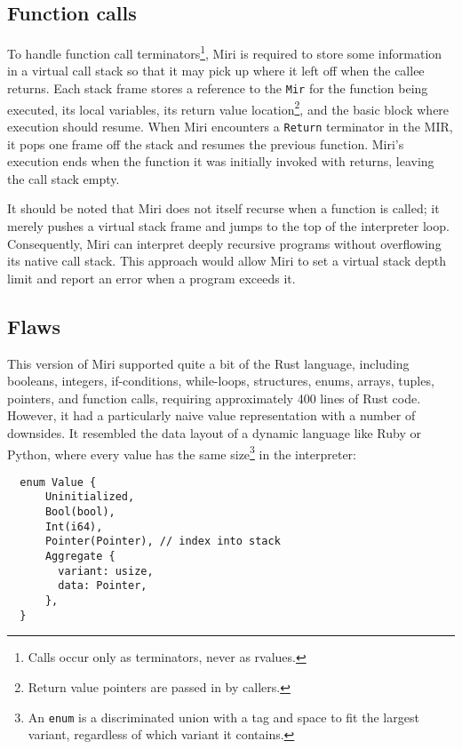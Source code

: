 \documentclass[twocolumn]{article}
\newcommand{\rust}[1]{\texttt{#1}}
\begin{document}
\subsection{Function calls}

To handle function call terminators\footnote{Calls occur only as terminators, never as rvalues.},
Miri is required to store some information in a virtual call stack so that it may pick up where it
left off when the callee returns. Each stack frame stores a reference to the \rust{Mir} for the
function being executed, its local variables, its return value location\footnote{Return value
pointers are passed in by callers.}, and the basic block where execution should resume. When Miri
encounters a \rust{Return} terminator in the MIR, it pops one frame off the stack and resumes the
previous function. Miri's execution ends when the function it was initially invoked with returns,
leaving the call stack empty.

It should be noted that Miri does not itself recurse when a function is called; it merely pushes a
virtual stack frame and jumps to the top of the interpreter loop. Consequently, Miri can interpret
deeply recursive programs without overflowing its native call stack. This approach would allow Miri
to set a virtual stack depth limit and report an error when a program exceeds it.

\subsection{Flaws}

This version of Miri supported quite a bit of the Rust language, including booleans, integers,
if-conditions, while-loops, structures, enums, arrays, tuples, pointers, and function calls,
requiring approximately 400 lines of Rust code. However, it had a particularly naive value
representation with a number of downsides. It resembled the data layout of a dynamic language like
Ruby or Python, where every value has the same size\footnote{An \rust{enum} is a discriminated union
with a tag and space to fit the largest variant, regardless of which variant it contains.} in the
interpreter:

\begin{verbatim}
  enum Value {
      Uninitialized,
      Bool(bool),
      Int(i64),
      Pointer(Pointer), // index into stack
      Aggregate {
        variant: usize,
        data: Pointer,
      },
  }
\end{verbatim}
\end{document}
